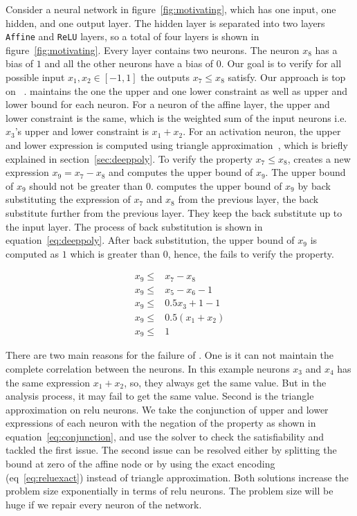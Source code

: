 Consider a neural network in figure~\ref{fig:motivating}, 
which has one input, one hidden, and one output layer. The hidden layer is separated into two layers 
\texttt{Affine} and \texttt{ReLU} layers, so a total of four layers is shown in figure~\ref{fig:motivating}. 
Every layer contains two neurons. The neuron $x_8$ has a bias of $1$ and all the other neurons have a bias of $0$. 
Our goal is to verify for all possible input $x_1,x_2 \in [-1,1]$ the outputs $x_7 \leq x_8$ satisfy. 
Our approach is top on \deeppoly{}~\cite{singh2019abstract}. \deeppoly{} maintains the one the upper and one lower constraint
as well as upper and lower bound for each neuron. For a neuron of the affine layer, the upper and lower constraint is 
the same, which is the weighted sum of the input neurons i.e. $x_3$'s upper and lower constraint is $x_1+x_2$. 
For an activation neuron, the upper and lower expression is computed using triangle approximation~\cite{singh2019abstract}, 
which is briefly explained in section~\ref{sec:deeppoly}. To verify the property $x_7 \leq x_8$, \deeppoly{} creates a 
new expression $x_9 = x_7 - x_8$ and computes the upper bound of $x_9$. The upper bound of $x_9$ should not be greater
than $0$. \deeppoly{} computes the upper bound of $x_9$ by back substituting the expression of $x_7$ and $x_8$ 
from the previous layer, the back substitute further from the previous layer. They keep the back substitute 
up to the input layer. The process of back substitution is shown in equation~\ref{eq:deeppoly}.
After back substitution, the upper bound of $x_9$ is computed as $1$ which is greater than $0$, 
hence, the \deeppoly{} fails to verify the property. 


\begin{equation}
    \begin{aligned}
        x_9 \leq  &  x_7 - x_8 \\
        x_9 \leq  & x_5 - x_6 - 1 \\
        x_9 \leq  & 0.5x_3 + 1 - 1 \\
        x_9 \leq  & 0.5(x_1+x_2) \\
        x_9 \leq  & 1
    \end{aligned}
\label{eq:deeppoly}
\end{equation}

There are two main reasons for the failure of \deeppoly{}. One is it can not maintain the complete correlation 
between the neurons. In this example neurons $x_3$ and $x_4$ has the same expression $x_1+x_2$, so, they always
get the same value. But in the \deeppoly{} analysis process, it may fail to get the same value. Second is the triangle
approximation on relu neurons.
We take the conjunction of upper and lower expressions of each neuron with the negation of the property
as shown in equation~\ref{eq:conjunction},
and use the \milp{} solver to check the satisfiability and tackled the first issue. 
The second issue can be resolved either by splitting the 
bound at zero of the affine node or by using the exact encoding (eq~\ref{eq:reluexact}) instead of triangle approximation.
Both solutions increase the problem size exponentially in terms of relu neurons. 
The problem size will be huge if we repair every neuron of the network. 

